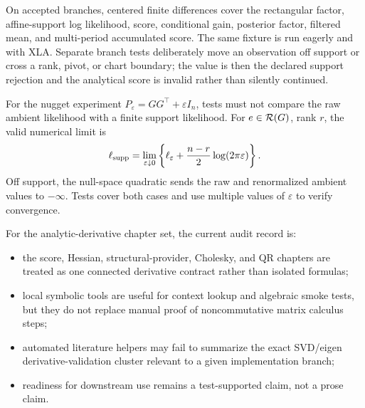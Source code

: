 On accepted branches, centered finite differences cover the rectangular
factor, affine-support log likelihood, score, conditional gain, posterior
factor, filtered mean, and multi-period accumulated score.  The same fixture
is run eagerly and with XLA.  Separate branch tests deliberately move an
observation off support or cross a rank, pivot, or chart boundary; the value is
then the declared support rejection and the analytical score is invalid rather
than silently continued.

For the nugget experiment \(P_\varepsilon=GG^\top+\varepsilon I_n\), tests
must not compare the raw ambient likelihood with a finite support likelihood.
For \(e\in{\cal R}(G)\), rank \(r\), the valid numerical limit is
\begin{equation}
\label{eq:bf-validation-renormalized-epsilon-limit}
 \ell_{\rm supp}
 =\lim_{\varepsilon\downarrow0}
 \left\{\ell_\varepsilon+
 \frac{n-r}{2}\log(2\pi\varepsilon)\right\}.
\end{equation}
Off support, the null-space quadratic sends the raw and renormalized ambient
values to \(-\infty\).  Tests cover both cases and use multiple values of
\(\varepsilon\) to verify convergence.

For the analytic-derivative chapter set, the current audit record is:
\begin{itemize}
  \item the score, Hessian, structural-provider, Cholesky, and QR chapters are
    treated as one connected derivative contract rather than isolated formulas;
  \item local symbolic tools are useful for context lookup and algebraic smoke
    tests, but they do not replace manual proof of noncommutative matrix
    calculus steps;
  \item automated literature helpers may fail to summarize the exact SVD/eigen
    derivative-validation cluster relevant to a given implementation branch;
  \item readiness for downstream use remains a test-supported claim, not a prose
    claim.
\end{itemize}
